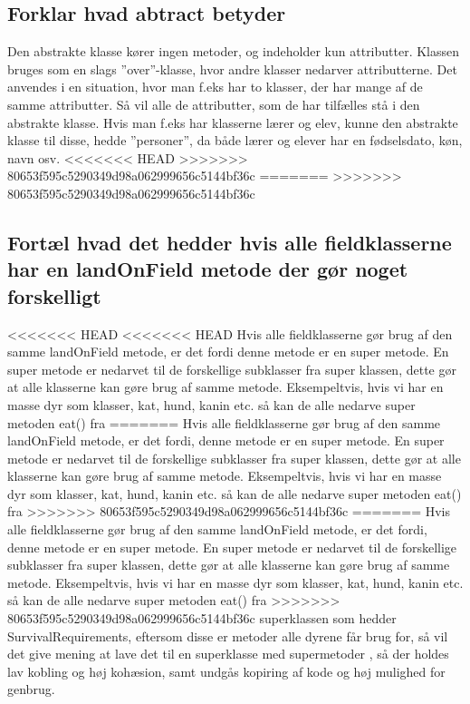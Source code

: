 \subsection{Forklar hvad abtract betyder}
Den abstrakte klasse kører ingen metoder, og indeholder kun attributter. Klassen bruges som en slags ”over”-klasse, hvor andre klasser nedarver attributterne. Det anvendes i en situation, hvor man f.eks har to klasser, der har mange af de samme attributter. Så vil alle de attributter, som de har tilfælles stå i den abstrakte klasse.
Hvis man f.eks har klasserne lærer og elev, kunne den abstrakte klasse til disse, hedde ”personer”, da både lærer og elever har en fødselsdato, køn, navn osv.
<<<<<<< HEAD
>>>>>>> 80653f595c5290349d98a062999656c5144bf36c
=======
>>>>>>> 80653f595c5290349d98a062999656c5144bf36c

\subsection{Fortæl hvad det hedder hvis alle fieldklasserne har en landOnField metode der gør noget forskelligt}

<<<<<<< HEAD
<<<<<<< HEAD
Hvis alle fieldklasserne gør brug af den samme landOnField metode, er det fordi denne metode er en super metode. En super metode er nedarvet til de forskellige subklasser fra super klassen, dette gør at alle klasserne kan gøre brug af samme metode. Eksempeltvis, hvis vi har en masse dyr som klasser, kat, hund, kanin etc. så kan de alle nedarve super metoden eat() fra 
=======
Hvis alle fieldklasserne gør brug af den samme landOnField metode, er det fordi, denne metode er en super metode. En super metode er nedarvet til de forskellige subklasser fra super klassen, dette gør at alle klasserne kan gøre brug af samme metode. Eksempeltvis, hvis vi har en masse dyr som klasser, kat, hund, kanin etc. så kan de alle nedarve super metoden eat() fra 
>>>>>>> 80653f595c5290349d98a062999656c5144bf36c
=======
Hvis alle fieldklasserne gør brug af den samme landOnField metode, er det fordi, denne metode er en super metode. En super metode er nedarvet til de forskellige subklasser fra super klassen, dette gør at alle klasserne kan gøre brug af samme metode. Eksempeltvis, hvis vi har en masse dyr som klasser, kat, hund, kanin etc. så kan de alle nedarve super metoden eat() fra 
>>>>>>> 80653f595c5290349d98a062999656c5144bf36c
superklassen som hedder SurvivalRequirements, eftersom disse er metoder alle dyrene får brug for, så vil det give mening at lave det til en superklasse med supermetoder
, så der holdes lav kobling og høj kohæsion, samt undgås kopiring af kode og høj mulighed for genbrug.

